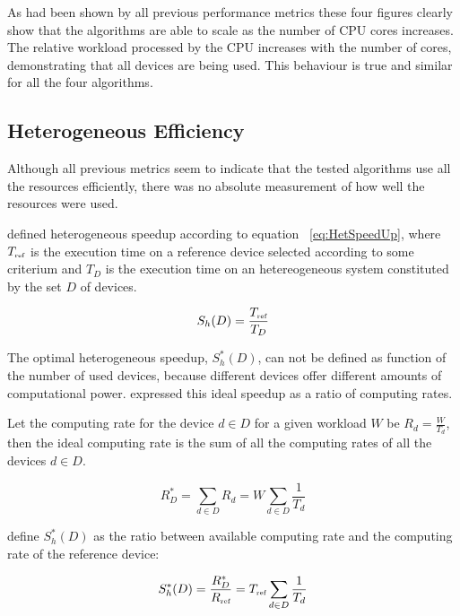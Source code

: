 As had been shown by all previous performance metrics these four figures clearly show that the algorithms are able to scale as the number of CPU cores increases. The relative workload processed by the CPU increases with the number of cores, demonstrating that all devices are being used. This behaviour is true and similar for all the four algorithms.

\subsection{\label{sec:hefficiency} Heterogeneous Efficiency}

Although all previous metrics seem to indicate that the tested algorithms use all the resources efficiently, there was no absolute measurement of how well the resources were used.

\cite{Chamberlain98} defined heterogeneous speedup according to equation ~\ref{eq:HetSpeedUp}, where $T_{\mbox{\tiny ref}}$ is the execution time on a reference device selected according to some criterium and $T_D$ is the execution time on an hetereogeneous system constituted by the set $D$ of devices.

\begin{equation}
S_h(D) = \frac{T_{\mbox{\tiny ref}}}{T_D}
\label{eq:HetSpeedUp}
\end{equation}

The optimal heterogeneous speedup, $S_h^*(D)$, can not be defined as function of the number of used devices, because different devices offer different amounts of computational power. \cite{Chamberlain98} expressed this ideal speedup as a ratio of computing rates. 

Let the computing rate for the device $d \in D$ for a given workload $W$ be $R_d = \frac{W}{T_d}$, then the ideal computing rate is the sum of all the computing rates of all the devices $d \in D$.

\begin{equation}
R^*_D = \sum_{d \in D} R_d = W \sum_{d \in D} \frac{1}{T_d}
\label{eq:StarCapacity}
\end{equation}

\cite{Chamberlain98} define $S_h^*(D)$ as the ratio between available computing rate and the computing rate of the reference device:

\begin{equation}
S^*_h(D) = \frac{R^*_D}{R_{\mbox{\tiny ref}}} = T_{\mbox{\tiny ref}} \sum_{d \in D} \frac{1}{T_d}
\label{eq:StarHetSpeedUp}
\end{equation}

